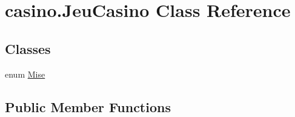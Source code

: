 \hypertarget{classcasino_1_1_jeu_casino}{}\section{casino.\+Jeu\+Casino Class Reference}
\label{classcasino_1_1_jeu_casino}
\subsection*{Classes}
\begin{DoxyCompactItemize}
\item 
enum \hyperlink{enumcasino_1_1_jeu_casino_1_1_mise}{Mise}
\end{DoxyCompactItemize}
\subsection*{Public Member Functions}
